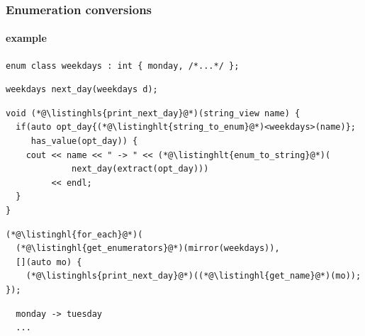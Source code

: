 \documentclass[compress,table,xcolor=table]{beamer}
\begin{document}
\begin{frame}[fragile]
  \frametitle{Enumeration conversions}
  \framesubtitle{example}
  \begin{lstlisting}[language=c++2x,basicstyle=\scriptsize\ttfamily]
enum class weekdays : int { monday, /*...*/ };
  \end{lstlisting}
  \begin{lstlisting}[language=c++2x,basicstyle=\scriptsize\ttfamily]
weekdays next_day(weekdays d);
  \end{lstlisting}
  \begin{lstlisting}[language=c++2x,basicstyle=\footnotesize\ttfamily]
void (*@\listinghls{print_next_day}@*)(string_view name) {
  if(auto opt_day{(*@\listinghlt{string_to_enum}@*)<weekdays>(name)};
     has_value(opt_day)) {
    cout << name << " -> " << (*@\listinghlt{enum_to_string}@*)(
             next_day(extract(opt_day)))
         << endl;
  }
}
  \end{lstlisting}
  \begin{lstlisting}[language=c++2x,basicstyle=\scriptsize\ttfamily]
(*@\listinghl{for_each}@*)(
  (*@\listinghl{get_enumerators}@*)(mirror(weekdays)),
  [](auto mo) {
    (*@\listinghls{print_next_day}@*)((*@\listinghl{get_name}@*)(mo));
});
  \end{lstlisting}
  \smaller
  \begin{verbatim}
  monday -> tuesday
  ...
  \end{verbatim}
\end{frame}
\end{document}
